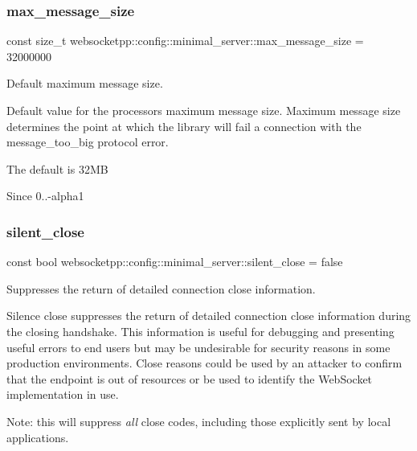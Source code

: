 \subsubsection{\texorpdfstring{max\+\_\+message\+\_\+size}{max\_message\_size}}
{\footnotesize\ttfamily const size\+\_\+t websocketpp\+::config\+::minimal\+\_\+server\+::max\+\_\+message\+\_\+size = 32000000\hspace{0.3cm}{\ttfamily [static]}}



Default maximum message size. 

Default value for the processor\textquotesingle{}s maximum message size. Maximum message size determines the point at which the library will fail a connection with the message\+\_\+too\+\_\+big protocol error.

The default is 32\+MB

\begin{DoxySince}{Since}
0..-\/alpha1 
\end{DoxySince}
\mbox{\label{structwebsocketpp_1_1config_1_1minimal__server_a2628ceea7ff3671afac22317f979e9c1}} 
\subsubsection{\texorpdfstring{silent\+\_\+close}{silent\_close}}
{\footnotesize\ttfamily const bool websocketpp\+::config\+::minimal\+\_\+server\+::silent\+\_\+close = false\hspace{0.3cm}{\ttfamily [static]}}



Suppresses the return of detailed connection close information. 

Silence close suppresses the return of detailed connection close information during the closing handshake. This information is useful for debugging and presenting useful errors to end users but may be undesirable for security reasons in some production environments. Close reasons could be used by an attacker to confirm that the endpoint is out of resources or be used to identify the Web\+Socket implementation in use.

Note\+: this will suppress {\itshape all} close codes, including those explicitly sent by local applications. \mbox{\label{structwebsocketpp_1_1config_1_1minimal__server_a5ea3c55d3cd784ef8cfb8c371a7ec209}} 
